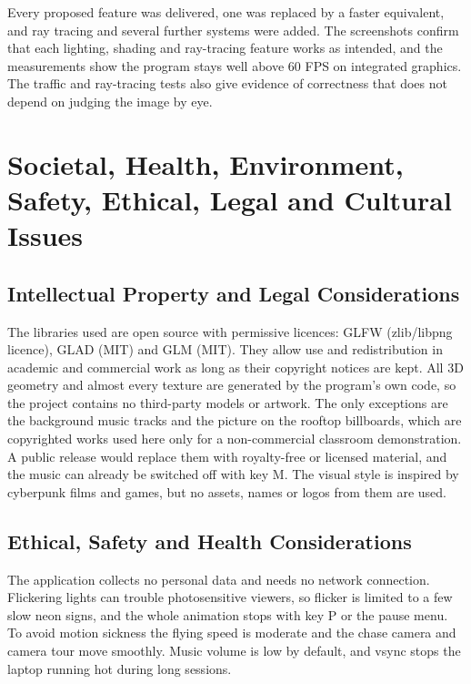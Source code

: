 \documentclass[12pt, a4paper]{report}
\begin{document}
\begin{justify}
  {\fontsize{12}{13.8}\selectfont
    Every proposed feature was delivered, one was replaced by a faster equivalent, and ray tracing and several further systems were added. The screenshots confirm that each lighting, shading and ray-tracing feature works as intended, and the measurements show the program stays well above 60 FPS on integrated graphics. The traffic and ray-tracing tests also give evidence of correctness that does not depend on judging the image by eye.
  }
\end{justify}

\chapter{Societal, Health, Environment, Safety, Ethical, Legal and Cultural Issues}

\section{Intellectual Property and Legal Considerations}

\begin{justify}
  {\fontsize{12}{13.8}\selectfont
    The libraries used are open source with permissive licences: GLFW (zlib/libpng licence), GLAD (MIT) and GLM (MIT). They allow use and redistribution in academic and commercial work as long as their copyright notices are kept. All 3D geometry and almost every texture are generated by the program's own code, so the project contains no third-party models or artwork. The only exceptions are the background music tracks and the picture on the rooftop billboards, which are copyrighted works used here only for a non-commercial classroom demonstration. A public release would replace them with royalty-free or licensed material, and the music can already be switched off with key M. The visual style is inspired by cyberpunk films and games, but no assets, names or logos from them are used.
  }
\end{justify}

\section{Ethical, Safety and Health Considerations}

\begin{justify}
  {\fontsize{12}{13.8}\selectfont
    The application collects no personal data and needs no network connection. Flickering lights can trouble photosensitive viewers, so flicker is limited to a few slow neon signs, and the whole animation stops with key P or the pause menu. To avoid motion sickness the flying speed is moderate and the chase camera and camera tour move smoothly. Music volume is low by default, and vsync stops the laptop running hot during long sessions.
  }
\end{justify}
\end{document}
